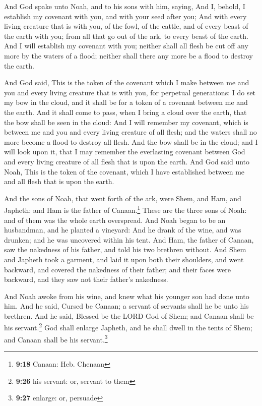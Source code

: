  And God spake unto Noah, and to his sons with him,
saying,  And I, behold, I establish my covenant with you,
and with your seed after you;  And with every living
creature that is with you, of the fowl, of the cattle, and of every
beast of the earth with you; from all that go out of the ark, to every
beast of the earth.  And I will establish my covenant
with you; neither shall all flesh be cut off any more by the waters of a
flood; neither shall there any more be a flood to destroy the earth.

 And God said, This is the token of the covenant which I
make between me and you and every living creature that is with you, for
perpetual generations:  I do set my bow in the cloud, and
it shall be for a token of a covenant between me and the earth.
 And it shall come to pass, when I bring a cloud over the
earth, that the bow shall be seen in the cloud:  And I
will remember my covenant, which is between me and you and every living
creature of all flesh; and the waters shall no more become a flood to
destroy all flesh.  And the bow shall be in the cloud;
and I will look upon it, that I may remember the everlasting covenant
between God and every living creature of all flesh that is upon the
earth.  And God said unto Noah, This is the token of the
covenant, which I have established between me and all flesh that is upon
the earth.

 And the sons of Noah, that went forth of the ark, were
Shem, and Ham, and Japheth: and Ham is the father of Canaan.\footnote{\textbf{9:18}
  Canaan: Heb. Chenaan}  These are the three sons of
Noah: and of them was the whole earth overspread.  And
Noah began to be an husbandman, and he planted a vineyard:
 And he drank of the wine, and was drunken; and he was
uncovered within his tent.  And Ham, the father of
Canaan, saw the nakedness of his father, and told his two brethren
without.  And Shem and Japheth took a garment, and laid
it upon both their shoulders, and went backward, and covered the
nakedness of their father; and their faces were backward, and they saw
not their father's nakedness.

 And Noah awoke from his wine, and knew what his younger
son had done unto him.  And he said, Cursed be Canaan; a
servant of servants shall he be unto his brethren.  And
he said, Blessed be the LORD God of Shem; and Canaan shall be his
servant.\footnote{\textbf{9:26} his servant: or, servant to them}
 God shall enlarge Japheth, and he shall dwell in the
tents of Shem; and Canaan shall be his servant.\footnote{\textbf{9:27}
  enlarge: or, persuade}

